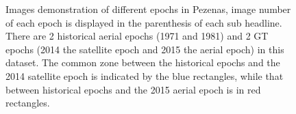 \begin{figure}[htbp]
\begin{center}
{\begin{minipage}[t]{0.48\linewidth}
    	\end{minipage}%
    }
        \caption{Images demonstration of different epochs in Pezenas, image number of each epoch is displayed in the parenthesis of each sub headline. There are 2 historical aerial epochs (1971 and 1981) and 2 GT epochs (2014 the satellite epoch and 2015 the aerial epoch) in this dataset. The common zone between the historical epochs and the 2014 satellite epoch is indicated by the blue rectangles, while that between historical epochs and the 2015 aerial epoch is in red rectangles.}
        \label{PezenasData}
    \end{center}
\end{figure} 


